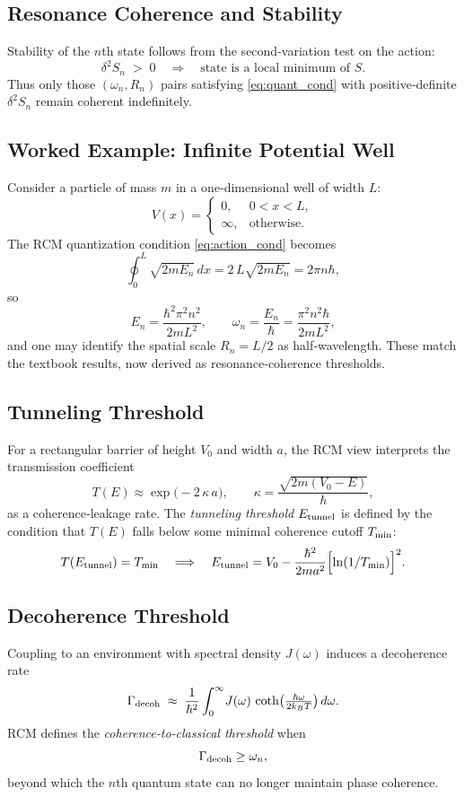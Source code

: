 \subsection{Resonance Coherence and Stability}
Stability of the $n$th state follows from the second‐variation test on the action:
\begin{equation}\label{eq:stability_cond}
\delta^2 S_n \;>\; 0 
\quad\Longrightarrow\quad
\text{state is a local minimum of }S.
\end{equation}
Thus only those $(\omega_n,R_n)$ pairs satisfying \eqref{eq:quant_cond} with positive‐definite $\delta^2 S_n$ remain coherent indefinitely.

\subsection{Worked Example: Infinite Potential Well}
Consider a particle of mass $m$ in a one‐dimensional well of width $L$:
\[
V(x)=\begin{cases}0,&0<x<L,\\
\infty,&\text{otherwise.}\end{cases}
\]
The RCM quantization condition \eqref{eq:action_cond} becomes
\[
\oint_0^L \sqrt{2mE_n}\,dx = 2\,L\sqrt{2mE_n} = 2\pi n \hbar,
\]
so
\[
E_n = \frac{\hbar^2\pi^2 n^2}{2mL^2}, 
\qquad
\omega_n = \frac{E_n}{\hbar} = \frac{\pi^2 n^2\hbar}{2mL^2},
\]
and one may identify the spatial scale $R_n = L/2$ as half‐wavelength.  These match the textbook results, now derived as resonance‐coherence thresholds.

\subsection{Tunneling Threshold}
For a rectangular barrier of height $V_0$ and width $a$, the RCM view interprets the transmission coefficient
\[
T(E) \approx \exp\!\bigl(-2\,\kappa\,a\bigr),
\qquad
\kappa = \frac{\sqrt{2m(V_0 - E)}}{\hbar},
\]
as a coherence‐leakage rate.  The {\it tunneling threshold} $E_{\rm tunnel}$ is defined by the condition that $T(E)$ falls below some minimal coherence cutoff $T_{\rm min}$:
\[
T(E_{\rm tunnel}) = T_{\rm min}
\quad\Longrightarrow\quad
E_{\rm tunnel} = V_0 - \frac{\hbar^2}{2m a^2}\Bigl[\ln(1/T_{\rm min})\Bigr]^2.
\]

\subsection{Decoherence Threshold}
Coupling to an environment with spectral density $J(\omega)$ induces a decoherence rate
\[
\Gamma_{\rm decoh} \;\approx\;\frac{1}{\hbar^2}
\int_0^\infty \!J(\omega)\,\coth\bigl(\tfrac{\hbar\omega}{2k_BT}\bigr)\,d\omega.
\]
RCM defines the {\it coherence‐to‐classical threshold} when
\[
\Gamma_{\rm decoh} \ge \omega_n,
\]
beyond which the $n$th quantum state can no longer maintain phase coherence.

